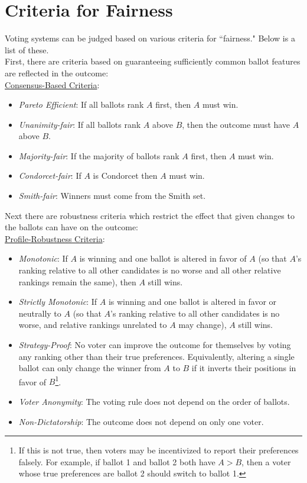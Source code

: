 \documentclass{amsart}
\begin{document}
\newpage 

\section{Criteria for Fairness}

Voting systems can be judged based on various criteria for ``fairness." Below is a list of these.\\

First, there are criteria based on guaranteeing sufficiently common ballot features are reflected in the outcome:\\

\noindent \underline{Consensus-Based Criteria}:
\begin{itemize}
	\item \textit{Pareto Efficient}: If all ballots rank $A$ first, then $A$ must win.
	\item \textit{Unanimity-fair}: If all ballots rank $A$ above $B$, then the outcome must have $A$ above $B$.
	\item \textit{Majority-fair}: If the majority of ballots rank $A$ first, then $A$ must win.
	\item \textit{Condorcet-fair}: If $A$ is Condorcet then $A$ must win.
	\item \textit{Smith-fair}: Winners must come from the Smith set.\\
\end{itemize}

Next there are robustness criteria which restrict the effect that given changes to the ballots can have on the outcome:\\

\noindent \underline{Profile-Robustness Criteria}:
\begin{itemize}
	\item \textit{Monotonic}: If $A$ is winning and one ballot is altered in favor of $A$ (so that $A$'s ranking relative to all other candidates is no worse and all other relative rankings remain the same), then $A$ still wins.
	\item \textit{Strictly Monotonic}: If $A$ is winning and one ballot is altered in favor or neutrally to $A$ (so that $A$'s ranking relative to all other candidates is no worse, and relative rankings unrelated to $A$ may change), $A$ still wins.
	\item \textit{Strategy-Proof}: No voter can improve the outcome for themselves by voting any ranking other than their true preferences. Equivalently, altering a single ballot can only change the winner from $A$ to $B$ if it inverts their positions in favor of $B$\footnote{If this is not true, then voters may be incentivized to report their preferences falsely. For example, if ballot 1 and ballot 2 both have $A>B$, then a voter whose true preferences are ballot 2 should switch to ballot 1.}. 
	\item \textit{Voter Anonymity}: The voting rule does not depend on the order of ballots.
	\item \textit{Non-Dictatorship}: The outcome does not depend on only one voter.\\
\end{itemize}
\end{document}
